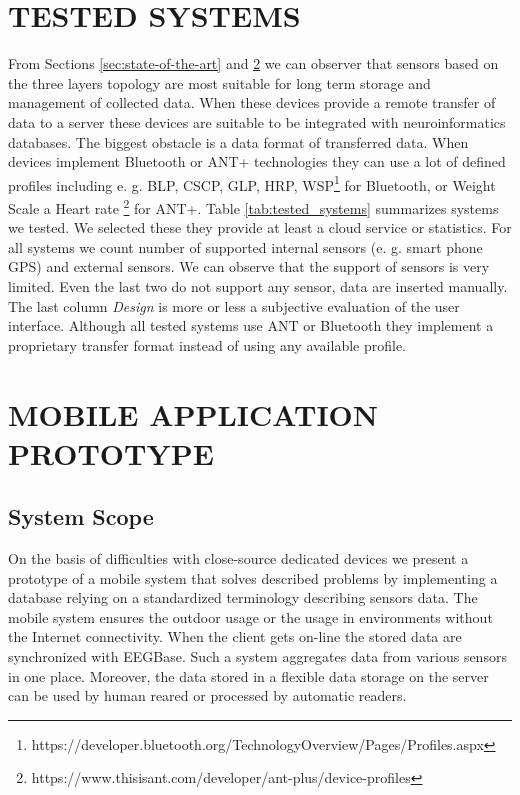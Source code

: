 \documentclass[a4paper,twoside]{article}
\begin{document}
\section{\uppercase{Tested systems}}
\label{tested_systems}
\noindent
From Sections \ref{sec:state-of-the-art} and \ref{mobile_app_prototype} we can observer that sensors based on the three layers topology are most suitable for long term storage and management of collected data. When these devices provide a remote transfer of data to a server these devices are suitable to be integrated with neuroinformatics databases. The biggest obstacle is a data format of transferred data. When devices implement Bluetooth or ANT+ technologies they can use a lot of defined profiles including e. g. BLP, CSCP, GLP, HRP, WSP\footnote{https://developer.bluetooth.org/TechnologyOverview/Pages/Profiles.aspx} for Bluetooth, or Weight Scale a Heart rate \footnote{https://www.thisisant.com/developer/ant-plus/device-profiles} for ANT+. Table \ref{tab:tested_systems} summarizes systems we tested. We selected these they provide at least a cloud service or statistics. For all systems we count number of supported internal sensors (e. g. smart phone GPS) and external sensors. We can observe that the support of sensors is very limited. Even the last two do not support any sensor, data are inserted manually. The last column \emph{Design} is more or less a subjective evaluation of the user interface. Although all tested systems use ANT or Bluetooth they implement a proprietary transfer format instead of using any available profile. 


\section{\uppercase{Mobile application prototype}}
\label{mobile_app_prototype}


\subsection{System Scope}

On the basis of difficulties with close-source dedicated devices we present a prototype of a mobile system that solves described problems by implementing a database relying on a standardized terminology describing sensors data. The mobile system ensures the outdoor usage or the usage in environments without the Internet connectivity. When the client gets on-line the stored data are synchronized with EEGBase. Such a system aggregates data from various sensors in one place. Moreover, the data stored in a flexible data storage on the server can be used by human reared or processed by automatic readers.
\end{document}
